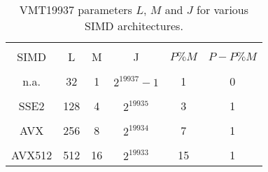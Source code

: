 \documentclass[preprint,1p,times]{elsarticle}
\begin{document}
\begin{table}[h!]
	\centering
	\begin{tabular}{|c | c | c | c | c | c|} 
		\hline
    	\vspace{-10pt}  & \vspace{0pt} & \vspace{0pt}& \vspace{0pt}& \vspace{0pt}& \vspace{0pt} \\
		SIMD   & L   & M & J & $P \% M$ & $P-P \% M$ \\
		\hline
    	\vspace{-9pt}  & \vspace{0pt} & \vspace{0pt}& \vspace{0pt}& \vspace{0pt}& \vspace{0pt} \\
		n.a.   & 32  & 1 & $2^{19937}-1$  & 1  & 0 \\		
		\hline
    	\vspace{-9pt}  & \vspace{0pt} & \vspace{0pt}& \vspace{0pt}& \vspace{0pt}& \vspace{0pt} \\
		SSE2   & 128 & 4 & $2^{19935}$  & 3  & 1 \\		
		\hline
    	\vspace{-9pt}  & \vspace{0pt} & \vspace{0pt}& \vspace{0pt}& \vspace{0pt}& \vspace{0pt} \\
		AVX    & 256 & 8 & $2^{19934}$  & 7  & 1 \\		
		\hline
    	\vspace{-9pt}  & \vspace{0pt} & \vspace{0pt}& \vspace{0pt}& \vspace{0pt}& \vspace{0pt} \\
		AVX512 & 512 & 16 & $2^{19933}$ & 15 & 1 \\		
		\hline
	\end{tabular}
	\caption{\label{tab:jvalues} VMT19937 parameters $L$, $M$ and $J$ for various SIMD architectures.}
\end{table}
\end{document}
